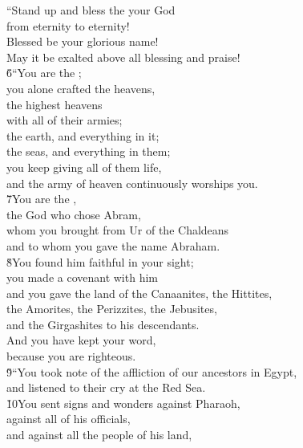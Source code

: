 \begin{poetry}
\poeml ``Stand up and bless the  your God \\
\poemll    from eternity to eternity! \\
\poeml Blessed be your glorious name! \\
\poemll    May it be exalted above all blessing and praise! \\
\poeml \v{6}``You are the ; \\
\poemll    you alone crafted the heavens, \\
\poeml the highest heavens \\
\poemll    with all of their armies; \\
\poeml the earth, and everything in it; \\
\poemll    the seas, and everything in them; \\
\poeml you keep giving all of them life, \\
\poemll    and the army of heaven continuously worships you. \\
\poeml \v{7}You are the , \\
\poemll    the God who chose Abram, \\
\poeml whom you brought from Ur of the Chaldeans \\
\poemll    and to whom you gave the name Abraham. \\
\poeml \v{8}You found him faithful in your sight; \\
\poemll    you made a covenant with him \\
\poeml and you gave the land of the Canaanites, the Hittites, \\
\poemll    the Amorites, the Perizzites, the Jebusites, \\
\poemlll       and the Girgashites to his descendants. \\
\poeml And you have kept your word, \\
\poemll    because you are righteous. \\
\poeml \v{9}``You took note of the affliction of our ancestors in Egypt, \\
\poemll    and listened to their cry at the Red Sea. \\
\poeml \v{10}You sent signs and wonders against Pharaoh, \\
\poemll    against all of his officials, \\
\poeml and against all the people of his land, \\

\end{poetry}
